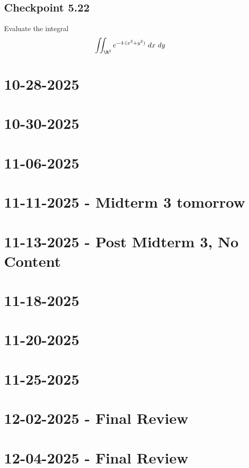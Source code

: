 \documentclass[]{mangos-musings}
\begin{document}
\subsection{Checkpoint 5.22}
Evaluate the integral 
\[
  \iint_{\R^2} e^{-4\cdot (x^2 + y^2)} \ dx \ dy 
\]

\newpage
\section{10-28-2025}

\newpage
\section{10-30-2025}

\newpage
\section{11-06-2025}

\newpage
\section{11-11-2025 - Midterm 3 tomorrow}

\newpage
\section{11-13-2025 - Post Midterm 3, No Content}

\newpage
\section{11-18-2025}

\newpage
\section{11-20-2025}

\newpage
\section{11-25-2025}

\newpage
\section{12-02-2025 - Final Review}

\newpage
\section{12-04-2025 - Final Review}
\end{document}
